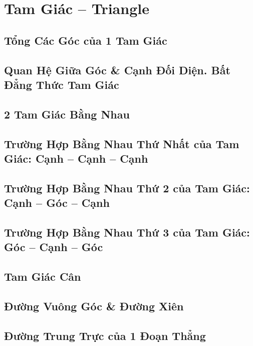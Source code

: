 \documentclass[oneside]{book}
\numberwithin{equation}{section}
\begin{document}

\chapter{Tam Giác -- Triangle}

\section{Tổng Các Góc của 1 Tam Giác}

\section{Quan Hệ Giữa Góc \& Cạnh Đối Diện. Bất Đẳng Thức Tam Giác}

\section{2 Tam Giác Bằng Nhau}

\section{Trường Hợp Bằng Nhau Thứ Nhất của Tam Giác: Cạnh -- Cạnh -- Cạnh}

\section{Trường Hợp Bằng Nhau Thứ 2 của Tam Giác: Cạnh -- Góc -- Cạnh}

\section{Trường Hợp Bằng Nhau Thứ 3 của Tam Giác: Góc -- Cạnh -- Góc}

\section{Tam Giác Cân}

\section{Đường Vuông Góc \& Đường Xiên}

\section{Đường Trung Trực của 1 Đoạn Thẳng}
\end{document}
